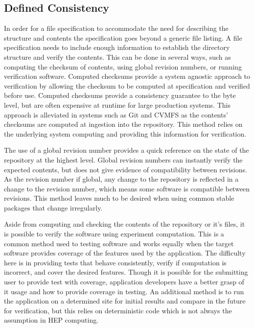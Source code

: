 \documentclass[conference]{IEEEtran}
\begin{document}
\subsection{Defined Consistency}
In order for a file specification to accommodate 
the need for describing the structure and contents
the specification goes beyond a generic file listing.
A file specification needs to include enough information
to establish the directory structure and verify the contents.
This can be done in several ways, 
such as computing the checksum of contents,
using global revision numbers, 
or running verification software.
Computed checksums provide a system agnostic approach
to verification by allowing the checksum to be computed
at specification and verified before use.
Computed checksums provide a
consistency guarantee to the byte level,
but are often expensive at runtime for large
production systems.
This approach is alleviated in systems such as 
Git and CVMFS as the contents' checksums are 
computed at ingestion into the repository.
This method relies on the underlying system computing
and providing this information for verification.

The use of a global revision number provides a quick reference
on the state of the repository at the highest level.
Global revision numbers can instantly verify the expected
contents, but does not give evidence of compatibility between
revisions.
As the revision number if global, any change to the repository
is reflected in a change to the revision number, which means 
some software is compatible between revisions.
This method leaves much to be desired when using common stable
packages that change irregularly.

Aside from computing and checking the contents of the
repository or it's files, it is possible to verify the
software using experiment computation.
This is a common method used to testing software
and works equally when the target software provides
coverage of the features used by the application.
The difficulty here is in providing tests that
behave consistently, verify if computation is
incorrect, and cover the desired features.
Though it is possible for the submitting user
to provide test with coverage, application
developers have a better grasp of it usage
and how to provide coverage in testing.
An additional method is to run the application
on a determined site for initial results and
compare in the future for verification, but
this relies on deterministic code which is 
not always the assumption in HEP computing.
\end{document}
